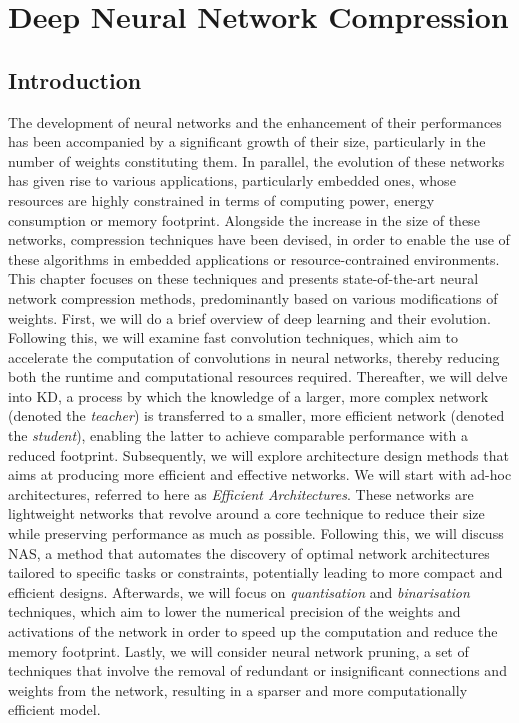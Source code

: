 \chapter{Deep Neural Network Compression}
\label{chap:sota}


\localtableofcontents

\section{Introduction}

The development of neural networks and the enhancement of their performances has
been accompanied by a significant growth of their size, particularly in the
number of weights constituting them. In parallel, the evolution of these
networks has given rise to various applications, particularly embedded ones,
whose resources are highly constrained in terms of computing power, energy
consumption or memory footprint. Alongside the increase in the size of these
networks, compression techniques have been devised, in order to enable the use
of these algorithms in embedded applications or resource-contrained
environments.\\

This chapter focuses on these techniques and presents state-of-the-art neural
network compression methods, predominantly based on various modifications of
weights. First, we will do a brief overview of deep learning and their
evolution. Following this, we will examine fast convolution techniques, which
aim to accelerate the computation of convolutions in neural networks, thereby
reducing both the runtime and computational resources required. Thereafter, we
will delve into \ac{KD}, a process by which the knowledge of a larger, more
complex network (denoted the \emph{teacher}) is transferred to a smaller, more
efficient network (denoted the \emph{student}), enabling the latter to achieve
comparable performance with a reduced footprint. Subsequently, we will explore
architecture design methods that aims at producing more efficient and effective
networks. We will start with ad-hoc architectures, referred to here as
\emph{Efficient Architectures}. These networks are lightweight networks that
revolve around a core technique to reduce their size while preserving
performance as much as possible. Following this, we will discuss \ac{NAS}, a
method that automates the discovery of optimal network architectures tailored to
specific tasks or constraints, potentially leading to more compact and efficient
designs. Afterwards, we will focus on \emph{quantisation} and
\emph{binarisation} techniques, which aim to lower the numerical precision of
the weights and activations of the network in order to speed up the computation
and reduce the memory footprint. Lastly, we will consider neural network
pruning, a set of techniques that involve the removal of redundant or
insignificant connections and weights from the network, resulting in a sparser
and more computationally efficient model.\\

